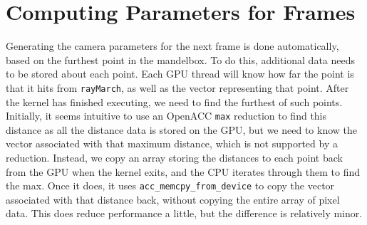 \documentclass[11pt]{article}
\begin{document}

\section{Computing Parameters for Frames}\label{Sec_AutomaticNav}
Generating the camera parameters for the next frame is done automatically, based on the furthest point in the mandelbox. To do this, additional data needs to be stored about each point. Each GPU thread will know how far the point is that it hits from \texttt{rayMarch}, as well as the vector representing that point. After the kernel has finished executing, we need to find the furthest of such points. Initially, it seems intuitive to use an OpenACC \texttt{max} reduction to find this distance as all the distance data is stored on the GPU, but we need to know the vector associated with that maximum distance, which is not supported by a reduction. Instead, we copy an array storing the distances to each point back from the GPU when the kernel exits, and the CPU iterates through them to find the max. Once it does, it uses \texttt{acc\_memcpy\_from\_device} to copy the vector associated with that distance back, without copying the entire array of pixel data. This does reduce performance a little, but the difference is relatively minor.\\
\end{document}
